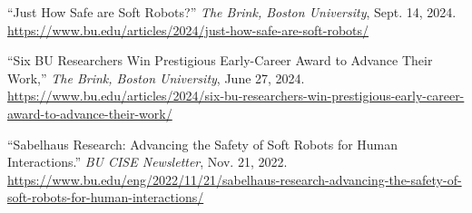 \documentclass[letterpaper]{deedy-resume} %
\begin{document}
\begin{etaremune}[itemsep=0.1cm]

\item ``Just How Safe are Soft Robots?'' {\it The Brink, Boston University}, Sept. 14, 2024. \\ \vspace{0.2cm} \href{https://www.bu.edu/articles/2024/just-how-safe-are-soft-robots/}{https://www.bu.edu/articles/2024/just-how-safe-are-soft-robots/}

\item ``Six BU Researchers Win Prestigious Early-Career Award to Advance Their Work,'' {\it The Brink, Boston University}, June 27, 2024.\\ \vspace{0.2cm} \href{https://www.bu.edu/articles/2024/six-bu-researchers-win-prestigious-early-career-award-to-advance-their-work/}{https://www.bu.edu/articles/2024/six-bu-researchers-win-prestigious-early-career-award-to-advance-their-work/}

\item ``Sabelhaus Research: Advancing the Safety of Soft Robots for Human Interactions.” {\it BU CISE Newsletter}, Nov. 21, 2022.\\ \vspace{0.2cm} \href{https://www.bu.edu/eng/2022/11/21/sabelhaus-research-advancing-the-safety-of-soft-robots-for-human-interactions/}{https://www.bu.edu/eng/2022/11/21/sabelhaus-research-advancing-the-safety-of-soft-robots-for-human-interactions/}

\end{etaremune}
\end{document}
